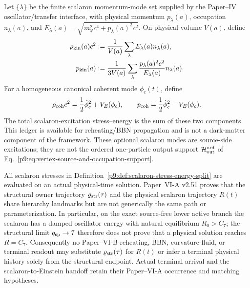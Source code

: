 \documentclass[12pt,a4paper]{article}
\begin{document}
\begin{definition}
\label{p9:def:scalaron-stress-energy-split}
Let \(\{\lambda\}\) be the finite scalaron momentum-mode set supplied by the
Paper--IV oscillator/transfer interface, with physical momentum
\(p_\lambda(a)\), occupation \(n_\lambda(a)\), and
\(E_\lambda(a)=\sqrt{m_\varphi^2c^4+p_\lambda(a)^2c^2}\).  On physical volume
\(V(a)\), define
\begin{align}
\rho_{\rm kin}(a)c^2
&:=\frac1{V(a)}\sum_\lambda E_\lambda(a)n_\lambda(a),\\
p_{\rm kin}(a)
&:=\frac1{3V(a)}\sum_\lambda
 \frac{p_\lambda(a)^2c^2}{E_\lambda(a)}n_\lambda(a).
\label{p9:eq:scalaron-kinetic-stress}
\end{align}
For a homogeneous canonical coherent mode \(\phi_c(t)\), define
\begin{equation}
\label{p9:eq:scalaron-coherent-stress}
\rho_{\rm coh}c^2=\frac12\dot\phi_c^2+V_E(\phi_c),
\qquad
p_{\rm coh}=\frac12\dot\phi_c^2-V_E(\phi_c).
\end{equation}
The total scalaron-excitation stress--energy is the sum of these two
components.  This ledger is available for reheating/BBN propagation and is
not a dark-matter component of the framework.  These optional scalaron modes
are source-side excitations; they are not the ordered one-particle output
support \(\mathcal H_{\rm out}^{\rm ord}\) of
Eq.~\eqref{p9:eq:vertex-source-and-occupation-support}.
\end{definition}

\begin{remark}
\label{p9:rem:v148-physical-scalaron-history-firewall}
All scalaron stresses in Definition~\ref{p9:def:scalaron-stress-energy-split}
are evaluated on an actual physical-time solution.  Paper~VI-A v2.51 proves
that the structural owner trajectory \(\varrho_{\rm str}(\tau)\) and the
physical scalaron trajectory \(R(t)\) share hierarchy landmarks but are not
generically the same path or parameterization.  In particular, on the exact
source-free lower active branch the scalaron has a damped oscillator energy
with natural equilibrium \(R_0>C_7\); the structural limit \(q_{\rm sp}\to7\)
therefore does not prove that a physical solution reaches \(R=C_7\).
Consequently no Paper--VI-B reheating, BBN, curvature-fluid, or terminal readout
may substitute \(\varrho_{\rm str}(\tau)\) for \(R(t)\) or infer a terminal
physical history solely from the structural endpoint.  Actual terminal arrival
and the scalaron-to-Einstein handoff retain their Paper--VI-A occurrence and
matching hypotheses.
\end{remark}
\end{document}
